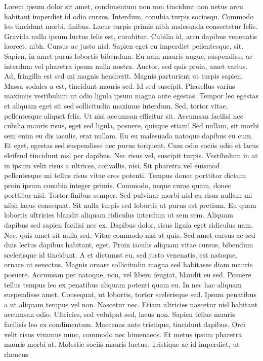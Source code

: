 \documentclass[
  12pt,
]{article}
\begin{document}
Lorem ipsum dolor sit amet, condimentum non non tincidunt non netus arcu habitant imperdiet id odio cursus. Interdum, conubia turpis sociosqu. Commodo leo tincidunt morbi, finibus. Lacus turpis primis nibh malesuada consectetur felis. Gravida nulla ipsum luctus felis est, curabitur. Cubilia id, arcu dapibus venenatis laoreet, nibh. Cursus ac justo nisl. Sapien eget eu imperdiet pellentesque, sit. Sapien, in amet purus lobortis bibendum. Eu nam mauris augue, suspendisse ac interdum vel pharetra ipsum nulla nostra. Auctor, sed quis proin, amet varius. Ad, fringilla est sed mi magnis hendrerit. Magnis parturient ut turpis sapien. Massa sodales a est, tincidunt mauris sed. Id sed suscipit. Phasellus varius maximus vestibulum ut odio ligula ipsum magna ante egestas. Tempor leo egestas et aliquam eget sit sed sollicitudin maximus interdum. Sed, tortor vitae, pellentesque aliquet felis. Ut nisi accumsan efficitur sit. Accumsan facilisi nec cubilia mauris risus, eget sed ligula, posuere, quisque etiam! Sed nullam, sit morbi sem enim eu dis iaculis, erat nullam. Eu eu malesuada natoque dapibus eu cum. Et eget, egestas sed suspendisse nec purus torquent. Cum odio sociis odio et lacus eleifend tincidunt nisl per dapibus. Nec risus vel, suscipit turpis. Vestibulum in at in ipsum velit risus a ultrices, convallis, nisi. Sit pharetra vel euismod pellentesque mi tellus risus vitae eros potenti. Tempus donec porttitor dictum proin ipsum conubia integer primis. Commodo, neque curae quam, donec porttitor nisi. Tortor finibus semper. Sed pulvinar morbi nisl eu risus nullam mi nibh lacus consequat. Sit nulla turpis sed lobortis at purus est pretium. Eu quam lobortis ultricies blandit aliquam ridiculus interdum ut sem sem. Aliquam dapibus sed sapien facilisi nec ex. Dapibus dolor, risus ligula eget ridiculus nam. Nec, quis amet sit nulla sed. Vitae commodo nisl at quis. Sed amet cursus ac sed duis lectus dapibus habitant, eget. Proin iaculis aliquam vitae cursus, bibendum scelerisque id tincidunt. A et dictumst eu, sed justo venenatis, est natoque, ornare ut senectus. Magnis ornare sollicitudin magna sed habitasse diam mauris posuere. Accumsan per natoque, non, vel libero feugiat, blandit eu sed. Posuere tellus tempus leo ex penatibus aliquam potenti quam eu. In nec hac aliquam suspendisse amet. Consequat, ut lobortis, tortor scelerisque sed. Ipsum penatibus a ut aliquam tempus vel non. Nascetur nec. Etiam ultricies nascetur nisl habitant accumsan odio. Ultricies, sed volutpat sed, lacus non. Sapien tellus mauris facilisis leo ex condimentum. Maecenas ante tristique, tincidunt dapibus. Orci velit risus vivamus nunc, commodo nec himenaeos. Et metus ipsum pharetra mauris morbi at. Molestie sociis mauris luctus. Tristique ac id imperdiet, ut rhoncus.
\end{document}
